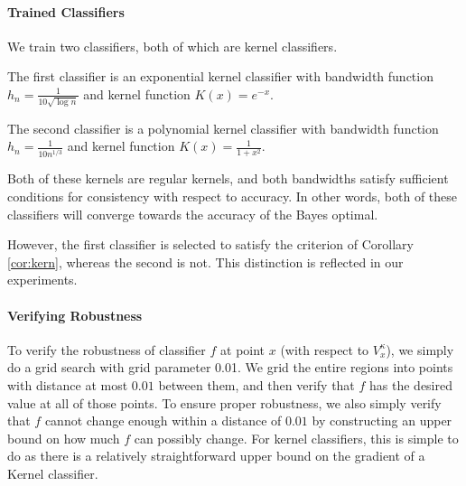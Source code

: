 \paragraph{Trained Classifiers} We train two classifiers, both of which are kernel classifiers. 

The first classifier is an exponential kernel classifier with bandwidth function $h_n = \frac{1}{10\sqrt{\log n}}$ and kernel function $K(x) = e^{-x}$. 

The second classifier is a polynomial kernel classifier with bandwidth function $h_n = \frac{1}{10n^{1/3}}$ and kernel function $K(x) = \frac{1}{1 + x^2}$. 

Both of these kernels are regular kernels, and both bandwidths satisfy sufficient conditions for consistency with respect to accuracy.  In other words, both of these classifiers will converge towards the accuracy of the Bayes optimal.

However, the first classifier is selected to satisfy the criterion of Corollary \ref{cor:kern}, whereas the second is not. This distinction is reflected in our experiments. 


\paragraph{Verifying Robustness} To verify the robustness of classifier $f$ at point $x$ (with respect to $V_x^\kappa$), we simply do a grid search with grid parameter 0.01. We grid the entire regions into points with distance at most $0.01$ between them, and then verify that $f$ has the desired value at all of those points. To ensure proper robustness, we also simply verify that $f$ cannot change enough within a distance of $0.01$ by constructing an upper bound on how much $f$ can possibly change. For kernel classifiers, this is simple to do as there is a relatively straightforward upper bound on the gradient of a Kernel classifier.


 